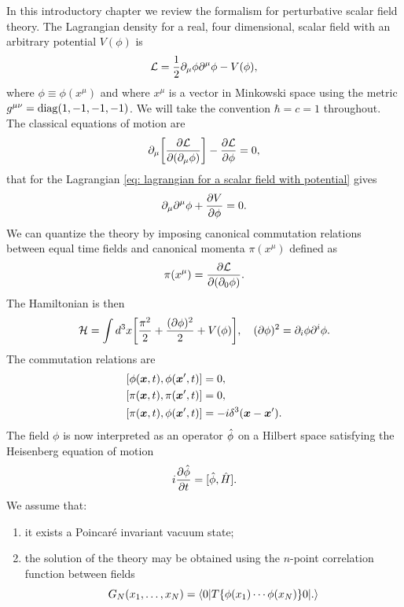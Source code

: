 In this introductory chapter we review the formalism for perturbative scalar field theory. The Lagrangian density for a real, four dimensional, scalar field with an arbitrary potential $V(\phi)$ is 
\begin{equation}
\label{eq: lagrangian for a scalar field with potential}
    \mathcal{L} = \frac{1}{2}\partial_\mu\phi\partial^\mu\phi - V(\phi),
\end{equation}
where $\phi \equiv \phi(x^\mu)$ and where $x^\mu$ is a vector in Minkowski space using the metric $g^{\mu\nu} = \mathrm{diag}(1,-1,-1,-1)$. We will take the convention $\hbar = c = 1$ throughout. The classical equations of motion are
\begin{equation}
\label{eq: Euler-Lagrange equations}
    \partial_\mu\bigg[\frac{\partial\mathcal{L}}{\partial(\partial_\mu\phi)}\bigg] - \frac{\partial\mathcal{L}}{\partial\phi} = 0,
\end{equation}
that for the Lagrangian \eqref{eq: lagrangian for a scalar field with potential} gives
\begin{equation}
    \partial_\mu\partial^\mu\phi + \frac{\partial V}{\partial \phi} = 0.
\end{equation}
We can quantize the theory by imposing canonical commutation relations between equal time fields and canonical momenta $\pi(x^\mu)$ defined as
\begin{equation}
    \pi(x^\mu) = \frac{\partial\mathcal{L}}{\partial(\partial_0\phi)}.
\end{equation}
The Hamiltonian is then
\begin{equation}
    \mathcal{H} = \int d^3x\bigg[\frac{\pi^2}{2} + \frac{(\partial \phi)^2}{2} + V(\phi)\bigg],\quad (\partial\phi)^2 = \partial_i\phi\partial^i\phi.
\end{equation}
The commutation relations are
\begin{align}
    \comm{\phi(\vx,t)}{\phi(\vx',t)} &= 0, \\
    \comm{\pi(\vx,t)}{\pi(\vx',t)} &= 0, \\
    \comm{\pi(\vx,t)}{\phi(\vx',t)} &= -i\delta^3(\vx - \vx').
\end{align}
The field $\phi$ is now interpreted as an operator $\hat{\phi}$ on a Hilbert space satisfying the Heisenberg equation of motion
\begin{equation}
    i\frac{\partial\hat{\phi}}{\partial t} = [\hat{\phi},\hat{H}].
\end{equation}
We assume that:
\begin{enumerate}
    \item it exists a Poincaré invariant vacuum state;
    \item the solution of the theory may be obtained using the $n$-point correlation function between fields
    \begin{equation}
        G_N(x_1,\dots,x_N) = \langle 0 | T\{\phi(x_1)\cdots\phi(x_N)\}{0} | . \rangle
    \end{equation}
\end{enumerate}
